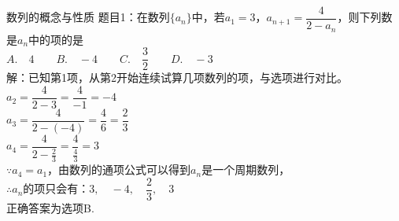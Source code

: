 \documentclass[aspectratio=169]{ctexbeamer} %
\date{\today}
\begin{document}
\begin{frame}{数列的概念与性质}
题目1：在数列$\{a_n\}$中，若$a_1 = 3$，$a_{n+1} = \dfrac{4}{2-a_n}$，则下列数是$a_n$中的项的是 \\
$A. \quad 4 \qquad B. \quad -4 \qquad C. \quad \dfrac{3}{2} \qquad D. \quad -3$ \\
\pause
解：已知第1项，从第2开始连续试算几项数列的项，与选项进行对比。\\
\pause
$a_2 = \dfrac{4}{2-3} = \dfrac{4}{-1} = -4$ \\
\pause
$a_3 = \dfrac{4}{2-(-4)} = \dfrac{4}{6} = \dfrac{2}{3}$ \\
\pause
$a_4 = \dfrac{4}{2-\frac{2}{3}} = \dfrac{4}{\frac{4}{3}} = 3$ \\
\pause
$\because a_4 = a_1$，由数列的通项公式可以得到${a_n}$是一个周期数列，\\
\pause
$\therefore {a_n}$的项只会有：$3, \quad -4, \quad \dfrac{2}{3}, \quad 3$ \\
\pause
正确答案为选项B.
\end{frame}
\end{document}
